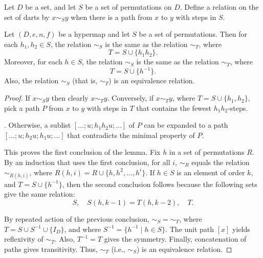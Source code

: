 \begin{definition}[$\sim_S$]
Let $D$ be a set, and let $S$ be a 
set of permutations on $D$.
Define a relation on the set of darts by $x\sim_S y$ when there is a
path from $x$ to $y$ with steps in $S$.
\end{definition}

\begin{lemma}\label{lemma:er} %
Let $(D,e,n,f)$ be a hypermap and let $S$ be a  set of permutations.
Then for each $h_1,h_2\in S$, 
the relation $\sim_S$ is the same as the relation $\sim_T$, where
\begin{displaymath}
T = S \cup \{h_1h_2\}.
\end{displaymath}
Moreover, for each $h\in S$, 
the relation $\sim_S$ is the same as the relation $\sim_T$, where
\begin{displaymath}
T = S \cup \{h^{-1}\}.
\end{displaymath}
Also,  the relation $\sim_S$ (that is, $\sim_T$) is an equivalence relation.  
%
\end{lemma}

\begin{proof} If $x\sim_S y$ then clearly $x\sim_T y$.  Conversely,
if $x\sim_T y$, where $T = S\cup\{h_1,h_2\}$, pick a path $P$ from $x$ to $y$ with steps
in $T$ that contains the fewest $h_1h_2$-steps.  

.  Otherwise, a sublist $[\ldots;u;h_1h_2u;\ldots]$
of $P$ can be expanded to a path $[\ldots;u;h_2u;h_1u;\ldots]$ that contradicts the minimal
property of $P$.

This proves the first conclusion of the lemma.  Fix $h$ in a set of permutations $R$.
By an induction that uses the first conclusion,  for all $i$, $\sim_R$ equals the relation $\sim_{R(h,i)}$,
where $R(h,i) = R \cup \{h,h^2,\ldots,h^i\}$.  If $h\in S$ is an element of order $k$, 
and $T = S\cup\{h^{-1}\}$, then
the second conclusion follows because the following sets give the same relation:
\begin{displaymath}
S,\quad S(h,k-1) = T(h,k-2),\quad T.
\end{displaymath}

By repeated action of the previous conclusion, $\sim_S=\sim_T$, where 
$T = S\cup S^{-1}\cup \{I_D\}$, and where $S^{-1} = \{h^{-1}\mid h\in S\}$.
The unit path $[x]$ yields reflexivity of $\sim_T$.  Also, $T^{-1} = T$ gives the symmetry.  Finally, concatenation of paths gives transitivity.  Thus, $\sim_T$ (i.e., $\sim_S$) is an equivalence relation.
\end{proof}

